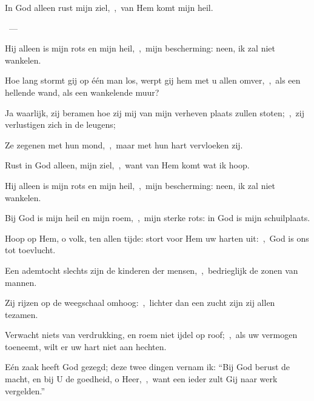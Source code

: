 \documentclass[12pt,twoside,a5paper]{article}
\begin{document}
\begin{halfparskip}
   
\end{halfparskip}

\begin{halfparskip}
   In God alleen rust mijn ziel,~\sep\ van Hem komt mijn heil.

  ~--- 

  Hij alleen is mijn rots en mijn heil,~\sep\ mijn bescherming: neen, ik zal niet wankelen.

  Hoe lang stormt gij op één man los, werpt gij hem met u allen omver,~\sep\ als een hellende wand, als een
  wankelende muur?

  Ja waarlijk, zij beramen hoe zij mij van mijn verheven plaats zullen stoten;~\sep\ zij verlustigen zich in de leugens;

  Ze zegenen met hun mond,~\sep\ maar met hun hart vervloeken zij.

  Rust in God alleen, mijn ziel,~\sep\ want van Hem komt wat ik hoop.

  Hij alleen is mijn rots en mijn heil,~\sep\ mijn bescherming: neen, ik zal niet wankelen.

  Bij God is mijn heil en mijn roem,~\sep\ mijn sterke rots: in God is mijn schuilplaats.

  Hoop op Hem, o volk, ten allen tijde: stort voor Hem uw harten uit:~\sep\ God is ons tot toevlucht.

  Een ademtocht slechts zijn de kinderen der mensen,~\sep\ bedrieglijk de zonen van mannen.

  Zij rijzen op de weegschaal omhoog:~\sep\ lichter dan een zucht zijn zij allen tezamen.

  Verwacht niets van verdrukking, en roem niet ijdel op roof;~\sep\ als uw vermogen toeneemt, wilt er uw hart niet aan hechten.

  Eén zaak heeft God gezegd; deze twee dingen vernam ik: ``Bij God berust de macht, en bij U de goedheid, o Heer,~\sep\ want een ieder zult Gij naar werk vergelden.''
\end{halfparskip}
\end{document}
